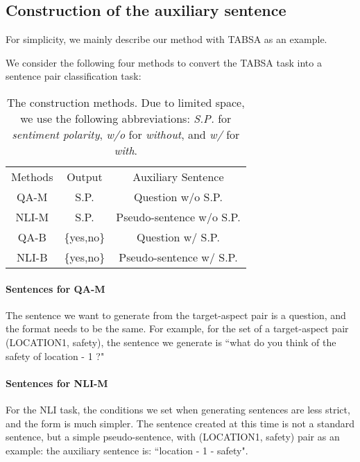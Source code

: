 \documentclass[11pt,a4paper]{article}
\theoremstyle{definition}
\begin{document}
    \subsection{Construction of the auxiliary sentence} \label{construct}
	For simplicity, we mainly describe our method with TABSA as an example.
	
	We consider the following four methods to convert the TABSA task into a sentence pair classification task:
	
	\begin{table}[ht]
		\centering
		\begin{tabular}{c c c}
			\toprule
			Methods & Output & Auxiliary Sentence  \\
			\cline{1-3}
			QA-M & S.P. & Question w/o S.P.\\			
			NLI-M & S.P. & Pseudo-sentence w/o S.P. \\
			QA-B & \{yes,no\} & Question w/ S.P. \\
			NLI-B & \{yes,no\} & Pseudo-sentence w/ S.P.\\
			\bottomrule
		\end{tabular}
		\caption {The construction methods. Due to limited space, we use the following abbreviations: \textit{S.P.} for \textit{sentiment polarity}, \textit{w/o} for \textit{without}, and \textit{w/} for \textit{with}. }
	\end{table}
	
	\paragraph{Sentences for QA-M}
	The sentence we want to generate from the target-aspect pair is a question, and the format needs to be the same. For example, for the set of a target-aspect pair (LOCATION1, safety), the sentence we generate is ``what do you think of the safety of location - 1 ?"
	
	\paragraph{Sentences for NLI-M}
	For the NLI task, the conditions we set when generating sentences are less strict, and the form is much simpler. The sentence created at this time is not a standard sentence, but a simple pseudo-sentence, with (LOCATION1, safety) pair as an example: the auxiliary sentence is: ``location - 1 -  safety".
	
\end{document}
